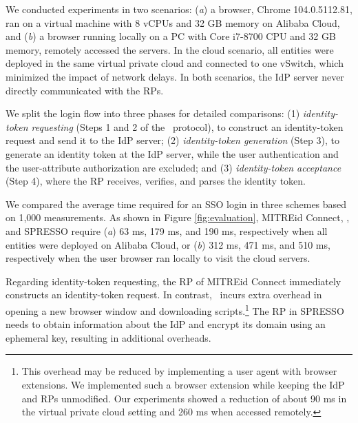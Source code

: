 We conducted experiments in two scenarios: (\emph{a}) a browser, Chrome 104.0.5112.81, ran on a virtual machine with 8 vCPUs and 32 GB memory on Alibaba Cloud, and (\emph{b}) a browser running locally on a PC with Core i7-8700 CPU and 32 GB memory, remotely accessed the servers.
In the cloud scenario, all entities were deployed in the same virtual private cloud and connected to one vSwitch, which minimized the impact of network delays. In both scenarios, the IdP server never directly communicated with the RPs.

 We split the login flow into three phases for detailed comparisons: (1)
{\em identity-token requesting} (Steps 1 and 2 of the \usso\ protocol), to construct an identity-token request and send it to the IdP server; (2) {\em identity-token generation} (Step 3), to generate an identity token at the IdP server, while the user authentication and the user-attribute authorization are excluded; and (3) {\em identity-token acceptance} (Step 4), where the RP receives, verifies, and parses the identity token.


We compared the average time required for an SSO login in three schemes based on 1,000 measurements. As shown in Figure \ref{fig:evaluation},
MITREid Connect, \usso, and SPRESSO require (\emph{a}) 63 ms, 179 ms, and 190 ms, respectively when all entities were deployed on Alibaba Cloud,
 or (\emph{b}) 312 ms, 471 ms, and 510 ms, respectively when the user browser ran locally to visit the cloud servers.

Regarding identity-token requesting, %
the RP of MITREid Connect immediately constructs an identity-token request. %
In contrast, \usso\ incurs extra overhead in opening a new browser window and downloading scripts.\footnote{This overhead may be reduced %
by implementing a user agent with browser extensions.
We implemented such a browser extension while keeping the IdP and RPs unmodified. Our experiments showed a reduction of about 90 ms in the virtual private cloud setting and 260 ms when accessed remotely.}
The RP in SPRESSO needs to obtain information about the IdP %
and encrypt its domain using an ephemeral key, resulting in additional overheads.

